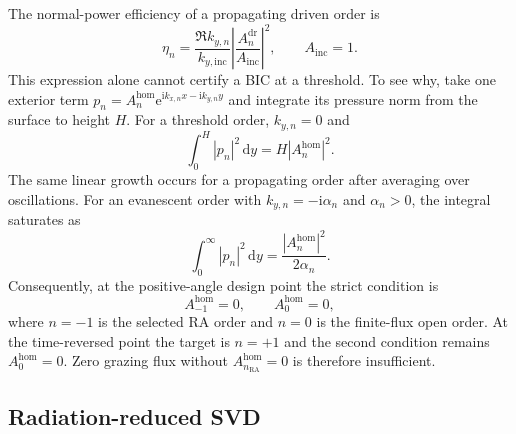 \documentclass[aps,prl,reprint,superscriptaddress,nofootinbib,floatfix]{revtex4-2}
\newcommand{\dd}{\,\mathrm{d}}
\newcommand{\ii}{\mathrm{i}}
\newcommand{\e}{\mathrm{e}}
\newcommand{\RA}{\mathrm{RA}}
\providecommand{\dr}{\mathrm{dr}}
\providecommand{\hom}{\mathrm{hom}}
\providecommand{\inc}{\mathrm{inc}}
\begin{document}
The normal-power efficiency of a propagating driven order is
\begin{equation}
 \eta_n=\frac{\Re k_{y,n}}{k_{y,\inc}}
 \left|\frac{A_n^{\dr}}{A_{\inc}}\right|^2,
 \qquad A_{\inc}=1 .
 \label{eq:s-efficiency}
\end{equation}
This expression alone cannot certify a BIC at a threshold.  To see why, take
one exterior term $p_n=A_n^{\hom}\e^{\ii k_{x,n}x-\ii k_{y,n}y}$ and integrate its
pressure norm from the surface to height $H$.  For a threshold order,
$k_{y,n}=0$ and
\begin{equation}
 \int_0^H |p_n|^2\dd y=H|A_n^{\hom}|^2 .
 \label{eq:s-threshold-norm}
\end{equation}
The same linear growth occurs for a propagating order after averaging over
oscillations.  For an evanescent order with $k_{y,n}=-\ii\alpha_n$ and
$\alpha_n>0$, the integral saturates as
\begin{equation}
 \int_0^\infty |p_n|^2\dd y=\frac{|A_n^{\hom}|^2}{2\alpha_n} .
 \label{eq:s-evanescent-norm}
\end{equation}
Consequently, at the positive-angle design point the strict condition is
\begin{equation}
 A_{-1}^{\hom}=0,\qquad A_0^{\hom}=0,
 \label{eq:s-strict-positive}
\end{equation}
where $n=-1$ is the selected RA order and $n=0$ is the finite-flux open order.
At the time-reversed point the target is $n=+1$ and the second condition
remains $A_0^{\hom}=0$.  Zero grazing flux without
$A_{n_{\RA}}^{\hom}=0$ is therefore insufficient.

\subsection{Radiation-reduced SVD}
\label{sec:s-svd}
\end{document}
